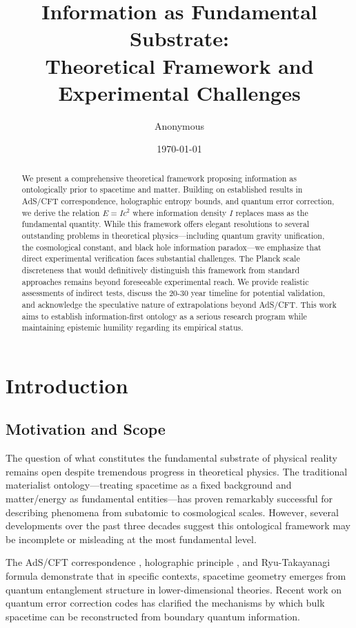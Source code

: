 \documentclass[12pt,twocolumn]{article}
\title{Information as Fundamental Substrate: \\
Theoretical Framework and Experimental Challenges}
\author{Anonymous}
\date{\today}
\theoremstyle{definition}
\theoremstyle{remark}
\begin{document}
\maketitle

\begin{abstract}
We present a comprehensive theoretical framework proposing information as ontologically prior to spacetime and matter. Building on established results in AdS/CFT correspondence, holographic entropy bounds, and quantum error correction, we derive the relation $E = Ic^2$ where information density $I$ replaces mass as the fundamental quantity. While this framework offers elegant resolutions to several outstanding problems in theoretical physics—including quantum gravity unification, the cosmological constant, and black hole information paradox—we emphasize that direct experimental verification faces substantial challenges. The Planck scale discreteness that would definitively distinguish this framework from standard approaches remains beyond foreseeable experimental reach. We provide realistic assessments of indirect tests, discuss the 20-30 year timeline for potential validation, and acknowledge the speculative nature of extrapolations beyond AdS/CFT. This work aims to establish information-first ontology as a serious research program while maintaining epistemic humility regarding its empirical status.
\end{abstract}

\section{Introduction}

\subsection{Motivation and Scope}

The question of what constitutes the fundamental substrate of physical reality remains open despite tremendous progress in theoretical physics. The traditional materialist ontology—treating spacetime as a fixed background and matter/energy as fundamental entities—has proven remarkably successful for describing phenomena from subatomic to cosmological scales. However, several developments over the past three decades suggest this ontological framework may be incomplete or misleading at the most fundamental level.

The AdS/CFT correspondence \cite{Maldacena1998}, holographic principle \cite{tHooft1993,Susskind1995}, and Ryu-Takayanagi formula \cite{Ryu2006} demonstrate that in specific contexts, spacetime geometry emerges from quantum entanglement structure in lower-dimensional theories. Recent work on quantum error correction codes \cite{Almheiri2015,Pastawski2015} has clarified the mechanisms by which bulk spacetime can be reconstructed from boundary quantum information.
\end{document}
